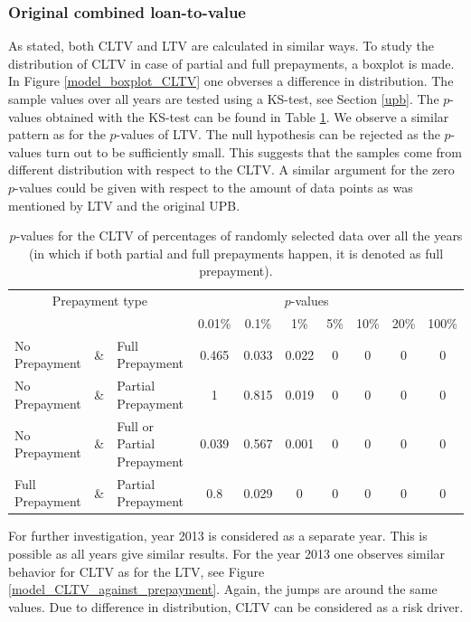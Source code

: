     \subsubsection{Original combined loan-to-value}
        As stated, both CLTV and LTV are calculated in similar ways. 
        To study the distribution of CLTV in case of partial and full 
        prepayments, a boxplot is made. In Figure \ref{model_boxplot_CLTV} 
        one obverses a difference in distribution. The sample values over all years are tested using a KS-test, see Section \ref{upb}. The $p$-values obtained with the KS-test can be found in Table
        \ref{model_Pvals_of_CLTV}. We observe a similar pattern as for the $p$-values of LTV. The null hypothesis can be rejected as the $p$-values turn out to be sufficiently small. This suggests that the samples come from different distribution with respect to the CLTV. 
        A similar argument for the zero $p$-values could 
        be given with respect to the amount of data points as was mentioned by LTV and the original UPB.
        \begin{table}[H]
        \centering
            \begin{tabular}{lcl|c|c|c|c|c|c|c}
                \multicolumn{3}{c|}{Prepayment type} 
                & \multicolumn{6}{c}{$p$-values}& \\
                &&&0.01\%&0.1\%&1\%&5\%&10\%&20\%&100\%\\\hline
                No Prepayment & \& & Full Prepayment & 0.465 & 0.033&0.022&0&0&0&0\\
                No Prepayment & \& & Partial Prepayment & 1 & 0.815&0.019&0&0&0&0\\
                No Prepayment & \& & Full or Partial Prepayment & 0.039 & 0.567&0.001&0&0&0&0 \\
                Full Prepayment & \& & Partial Prepayment & 0.8 & 0.029&0&0&0&0&0
		    \end{tabular}
            \caption{
                $p$-values for the CLTV of percentages of randomly selected data over all the years (in which if both partial and full 
                prepayments happen, it is denoted as full prepayment).
                }
	        \label{model_Pvals_of_CLTV}
        \end{table}
        For further investigation, year 2013 is considered 
        as a separate year. This is possible as all years give
        similar results. 
        For the year 2013 one observes similar behavior 
        for CLTV as for the LTV, see Figure \ref{model_CLTV_against_prepayment}. Again, the jumps are around the same values. Due to difference in distribution, CLTV can be considered as a risk driver.
